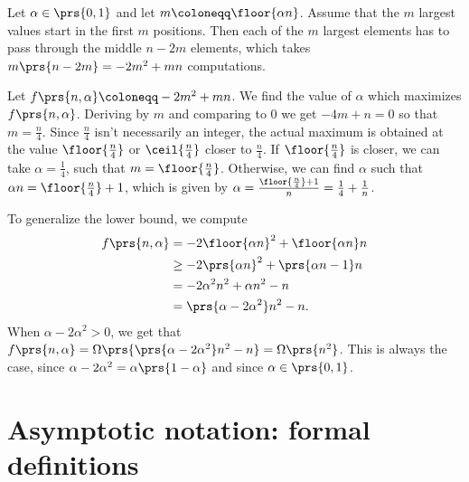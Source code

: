\documentclass[oneside]{scrbook}
\theoremstyle{definition}
\begin{document}
\begin{exercise}
    Let $\alpha \in \prs{0,1}$ and let $m \coloneqq \floor{\alpha n}$.
    Assume that the $m$ largest values start in the first $m$ positions. Then each of the $m$ largest elements has to pass through the middle $n - 2m$ elements, which takes $m\prs{n-2m} = - 2m^2 + mn$ computations.     
    
    Let $f\prs{n, \alpha} \coloneqq - 2m^2 + mn$. We find the value of $\alpha$ which maximizes $f\prs{n,\alpha}$.
    Deriving by $m$ and comparing to $0$ we get $-4m + n = 0$ so that $m = \frac{n}{4}$. Since $\frac{n}{4}$ isn't necessarily an integer, the actual maximum is obtained at the value $\floor{\frac{n}{4}}$ or $\ceil{\frac{n}{4}}$ closer to $\frac{n}{4}$.
    If $\floor{\frac{n}{4}}$ is closer, we can take $\alpha = \frac{1}{4}$, such that $m = \floor{\frac{n}{4}}$. Otherwise, we can find $\alpha$ such that $\alpha n = \floor{\frac{n}{4}} + 1$, which is given by $\alpha = \frac{\floor{\frac{n}{4}} + 1}{n} = \frac{1}{4} + \frac{1}{n}$. 

    To generalize the lower bound, we compute
    \begin{align*}
        f\prs{n,\alpha} &= -2\floor{\alpha n}^2 + \floor{\alpha n}n \\
        &\geq -2\prs{\alpha n}^2 + \prs{\alpha n - 1}n \\
        &= -2 \alpha^2 n^2 + \alpha n^2 - n \\
        &= \prs{\alpha - 2 \alpha^2} n^2 - n \text{.}
    \end{align*}
    When $\alpha - 2 \alpha^2 > 0$, we get that $f\prs{n,\alpha} = \Omega\prs{\prs{\alpha - 2 \alpha^2} n^2 - n} = \Omega\prs{n^2}$. This is always the case, since $\alpha - 2 \alpha^2 = \alpha\prs{1 - \alpha}$ and since $\alpha \in \prs{0,1}$.
\end{exercise}

\section{Asymptotic notation: formal definitions}
\end{document}
